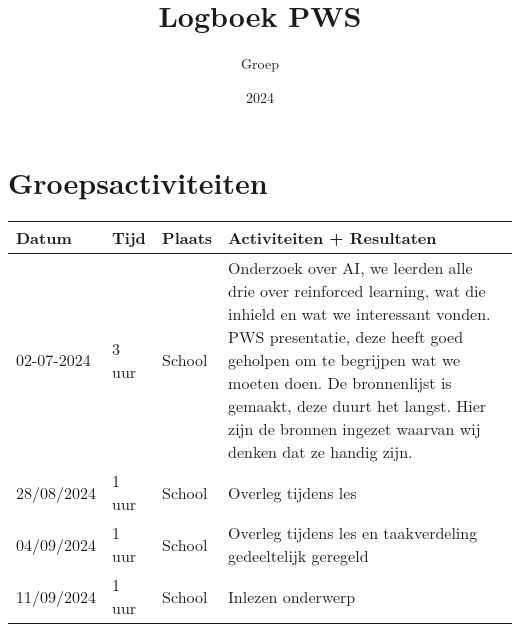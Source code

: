 \documentclass{article}
\title{Logboek PWS}
\author{Groep}
\date{2024}
\begin{document}
\maketitle


\section*{Groepsactiviteiten}
\begin{longtable}{|p{}|p{}|p{}|p{}|}
    \hline
    \textbf{Datum} & \textbf{Tijd} & \textbf{Plaats} & \textbf{Activiteiten + Resultaten}                                                                                                                                                                                                                                                                                   \\
    \hline
    02-07-2024     & 3 uur         & School          & Onderzoek over AI, we leerden alle drie over reinforced learning, wat die inhield en wat we interessant vonden. PWS presentatie, deze heeft goed geholpen om te begrijpen wat we moeten doen. De bronnenlijst is gemaakt, deze duurt het langst. Hier zijn de bronnen ingezet waarvan wij denken dat ze handig zijn. \\
    \hline
    28/08/2024     & 1 uur         & School          & Overleg tijdens les                                                                                                                                                                                                                                                                                                  \\
    \hline
    04/09/2024     & 1 uur         & School          & Overleg tijdens les en taakverdeling gedeeltelijk geregeld                                                                                                                                                                                                                                                           \\
    \hline
    11/09/2024     & 1 uur         & School          & Inlezen onderwerp                                                                                                                                                                                                                                                                                                    \\

\end{longtable}
\end{document}
